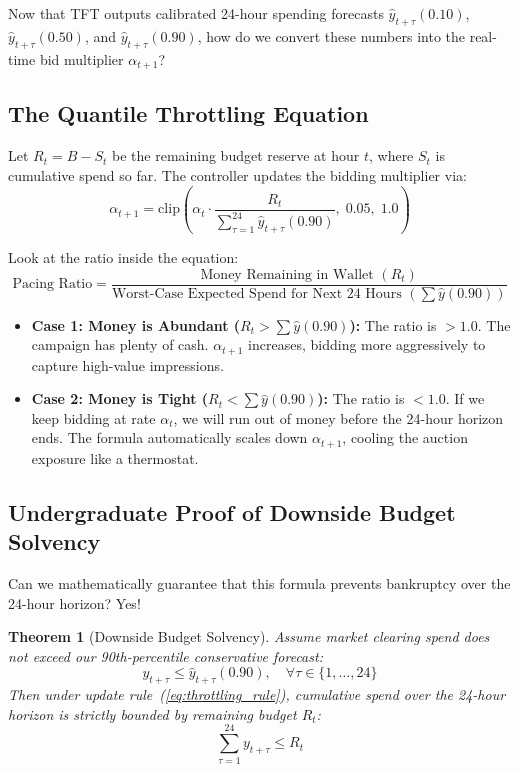 \documentclass[11pt,a4paper]{article}
\newtheorem{theorem}{Theorem}[section]
\begin{document}
Now that TFT outputs calibrated 24-hour spending forecasts $\hat{y}_{t+\tau}(0.10)$, $\hat{y}_{t+\tau}(0.50)$, and $\hat{y}_{t+\tau}(0.90)$, how do we convert these numbers into the real-time bid multiplier $\alpha_{t+1}$?

\subsection{The Quantile Throttling Equation}
Let $R_t = B - S_t$ be the remaining budget reserve at hour $t$, where $S_t$ is cumulative spend so far.
The controller updates the bidding multiplier via:
\begin{equation}
    \alpha_{t+1} = \mathrm{clip}\left( \alpha_t \cdot \frac{R_t}{\sum_{\tau=1}^{24} \hat{y}_{t+\tau}(0.90)}, \; 0.05, \; 1.0 \right)
    \label{eq:throttling_rule}
\end{equation}

\begin{intuitionbox}
Look at the ratio inside the equation:
\begin{equation}
    \text{Pacing Ratio} = \frac{\text{Money Remaining in Wallet } (R_t)}{\text{Worst-Case Expected Spend for Next 24 Hours } \left(\sum \hat{y}(0.90)\right)}
\end{equation}
\begin{itemize}
    \item \textbf{Case 1: Money is Abundant ($R_t > \sum \hat{y}(0.90)$):}
    The ratio is $> 1.0$. The campaign has plenty of cash. $\alpha_{t+1}$ increases, bidding more aggressively to capture high-value impressions.
    \item \textbf{Case 2: Money is Tight ($R_t < \sum \hat{y}(0.90)$):}
    The ratio is $< 1.0$. If we keep bidding at rate $\alpha_t$, we will run out of money before the 24-hour horizon ends. The formula automatically scales down $\alpha_{t+1}$, cooling the auction exposure like a thermostat.
\end{itemize}
\end{intuitionbox}

\subsection{Undergraduate Proof of Downside Budget Solvency}
Can we mathematically guarantee that this formula prevents bankruptcy over the 24-hour horizon? Yes!

\begin{theorem}[Downside Budget Solvency]
Assume market clearing spend does not exceed our 90th-percentile conservative forecast:
\begin{equation}
    y_{t+\tau} \le \hat{y}_{t+\tau}(0.90), \quad \forall \tau \in \{1, \dots, 24\}
\end{equation}
Then under update rule~(\ref{eq:throttling_rule}), cumulative spend over the 24-hour horizon is strictly bounded by remaining budget $R_t$:
\begin{equation}
    \sum_{\tau=1}^{24} y_{t+\tau} \le R_t
\end{equation}
\end{theorem}
\end{document}
